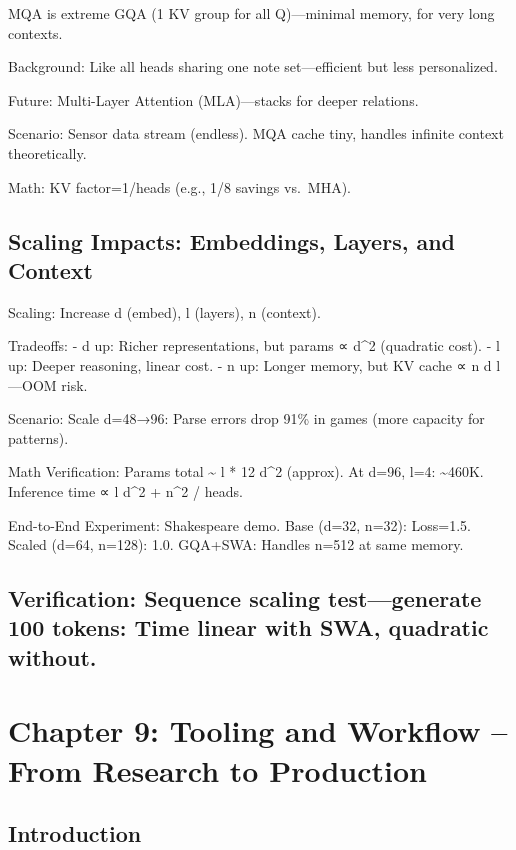 \documentclass[
]{article}
\begin{document}
MQA is extreme GQA (1 KV group for all Q)---minimal memory, for very
long contexts.

Background: Like all heads sharing one note set---efficient but less
personalized.

Future: Multi-Layer Attention (MLA)---stacks for deeper relations.

Scenario: Sensor data stream (endless). MQA cache tiny, handles infinite
context theoretically.

Math: KV factor=1/heads (e.g., 1/8 savings vs.~MHA).

\subsection{Scaling Impacts: Embeddings, Layers, and
Context}\label{scaling-impacts-embeddings-layers-and-context}

Scaling: Increase d (embed), l (layers), n (context).

Tradeoffs: - d up: Richer representations, but params ∝ d\^{}2
(quadratic cost). - l up: Deeper reasoning, linear cost. - n up: Longer
memory, but KV cache ∝ n d l---OOM risk.

Scenario: Scale d=48→96: Parse errors drop 91\% in games (more capacity
for patterns).

Math Verification: Params total \textasciitilde{} l * 12 d\^{}2
(approx). At d=96, l=4: \textasciitilde460K. Inference time ∝ l d\^{}2 +
n\^{}2 / heads.

End-to-End Experiment: Shakespeare demo. Base (d=32, n=32): Loss=1.5.
Scaled (d=64, n=128): 1.0. GQA+SWA: Handles n=512 at same memory.

\subsection{Verification: Sequence scaling test---generate 100 tokens:
Time linear with SWA, quadratic
without.}\label{verification-sequence-scaling-testgenerate-100-tokens-time-linear-with-swa-quadratic-without.}

\section{Chapter 9: Tooling and Workflow -- From Research to
Production}\label{chapter-9-tooling-and-workflow-from-research-to-production}

\subsection{Introduction}\label{introduction-8}
\end{document}
